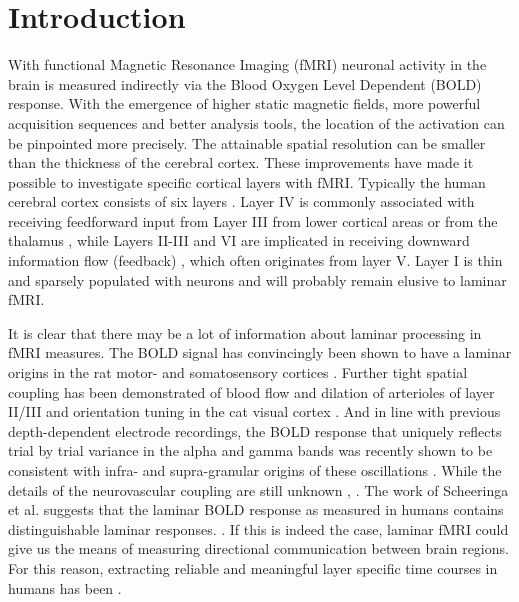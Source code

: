 \section{Introduction}
With functional Magnetic Resonance Imaging (fMRI) neuronal activity in the brain is measured indirectly via the Blood Oxygen Level Dependent (BOLD) response. With the emergence of higher static magnetic fields, more powerful acquisition sequences and better analysis tools, the location of the activation can be pinpointed  more  precisely. The attainable spatial resolution can be  smaller than the thickness of the cerebral cortex. These improvements have made it possible to investigate specific cortical layers with fMRI.
Typically the human cerebral cortex consists of six  layers \cite{Brodmann1909}. Layer IV is commonly associated with receiving feedforward input from Layer III from lower cortical areas or from the thalamus \cite{Jones1998}, while Layers II-III and VI are implicated in receiving downward information flow (feedback) \cite{Alitto2003}, which often originates from layer V. Layer I is thin and sparsely populated with neurons and will probably remain elusive to laminar fMRI. 

It is clear that there may be a lot of information about laminar processing in fMRI measures. The BOLD signal has convincingly been shown to have a laminar origins in the rat motor- and somatosensory cortices \cite{Yu2014}. Further tight spatial coupling has been demonstrated of blood flow and dilation of arterioles of layer II/III and orientation tuning in the cat visual cortex \cite{OHerron2016}. And in line with previous depth-dependent electrode recordings, the BOLD response that uniquely re\cite{Huber2018}flects trial by trial variance in the alpha and gamma bands was recently shown to be consistent with infra- and supra-granular origins of these oscillations \cite{Scheeringa2016}. While the details of the neurovascular coupling are still unknown \cite{Uludag2017},  \cite{Markuerkiaga2016}. The work of Scheeringa et al. suggests that the laminar BOLD response as measured in humans \cite[e.g.]{Koopmans2010,Polimeni2010,Maass2014,Kok2016} contains distinguishable laminar responses.  \cite{Huber2018}.
If this is indeed the case, laminar fMRI could give us the means of measuring directional communication between brain regions. For this reason, extracting reliable and meaningful layer specific time courses in humans has been  \cite{Barazany2012,Lawrence2017}. 

